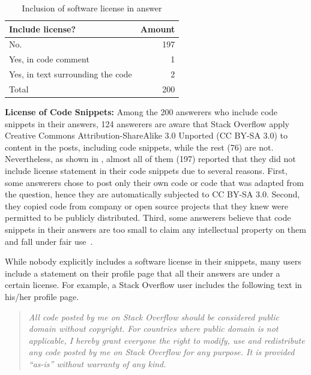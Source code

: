 \documentclass[10pt,journal,compsoc]{IEEEtran}
\begin{document}

\begin{table}
	\centering
	\caption{Inclusion of software license in answer}
	\label{tab:survey_license_include}
	\begin{tabular}{lr}
		\toprule
		Include license? & Amount \\
		\midrule
		No. & 197 \\
		Yes, in code comment &	1 \\
		Yes, in text surrounding the code & 2 \\
		\midrule
		Total & 200 \\
		\bottomrule
	\end{tabular}
\end{table}

\textbf{License of Code Snippets:} Among the 200 answerers who include code snippets in their answers, 124
answerers are aware that Stack Overflow apply Creative Commons
Attribution-ShareAlike 3.0 Unported (CC BY-SA 3.0) to content in the posts,
including code snippets, while the rest (76) are not. Nevertheless, as shown in
, almost all of them (197) reported that they
did not include license statement in their code snippets due to several reasons.
First, some answerers chose to post only their own code or code that was adapted
from the question, hence they are automatically subjected to CC BY-SA 3.0.
Second, they copied code from company or open source projects that they knew
were permitted to be publicly distributed. Third, some answerers believe that
code snippets in their answers are too small to claim any intellectual property
on them and fall under fair use~\cite{fairuse}.

While nobody explicitly includes a software license in their snippets,
many users include a statement on their profile page that all their
answers are under a certain license. For example, a Stack Overflow user includes 
the following text in his/her profile page.

\begin{quotation}
	\noindent \textit{All code posted by me on
		Stack Overflow should be considered public domain without copyright. For
		countries where public domain is not applicable, I hereby grant everyone the
		right to modify, use and redistribute any code posted by me on Stack Overflow
		for any purpose. It is provided ``as-is'' without warranty of any kind.}
\end{quotation}
\end{document}
